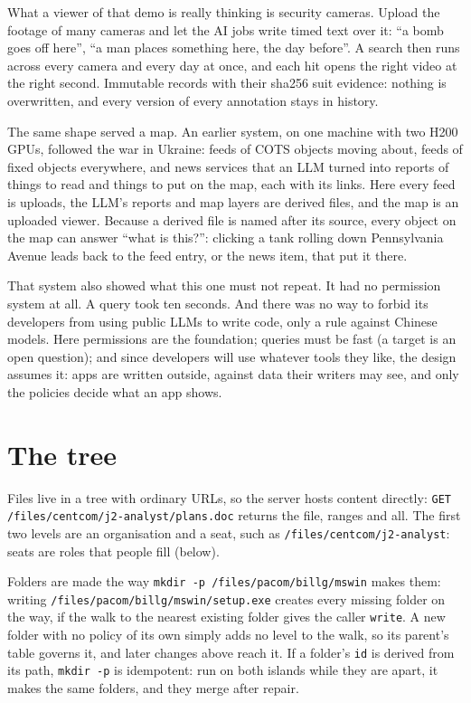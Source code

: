 \documentclass[11pt,oneside]{book}
\begin{document}
What a viewer of that demo is really thinking is security cameras. Upload the
footage of many cameras and let the AI jobs write timed text over it: ``a bomb
goes off here'', ``a man places something here, the day before''. A search then
runs across every camera and every day at once, and each hit opens the right
video at the right second. Immutable records with their sha256 suit evidence:
nothing is overwritten, and every version of every annotation stays in history.

The same shape served a map. An earlier system, on one machine with two
H200 GPUs, followed the war in Ukraine: feeds of COTS objects moving about, feeds
of fixed objects everywhere, and news services that an LLM turned into reports
of things to read and things to put on the map, each with its links. Here every
feed is uploads, the LLM's reports and map layers are derived files, and the map
is an uploaded viewer. Because a derived file is named after its source, every
object on the map can answer ``what is this?'': clicking a tank rolling down
Pennsylvania Avenue leads back to the feed entry, or the news item, that put it
there.

That system also showed what this one must not repeat. It had no permission
system at all. A query took ten seconds. And there was no way to forbid its
developers from using public LLMs to write code, only a rule against Chinese
models. Here permissions are the foundation; queries must be fast (a target is
an open question); and since developers will use whatever tools they like, the
design assumes it: apps are written outside, against data their writers may
see, and only the policies decide what an app shows.

\section{The tree}
Files live in a tree with ordinary URLs, so the server hosts content directly:
\texttt{GET /files/centcom/j2-analyst/plans.doc} returns the file, ranges and all.
The first two levels are an organisation and a seat, such as
\texttt{/files/centcom/j2-analyst}: seats are roles that people fill (below).

Folders are made the way \texttt{mkdir -p /files/pacom/billg/mswin} makes them:
writing \texttt{/files/pacom/billg/mswin/setup.exe} creates every missing folder on
the way, if the walk to the nearest existing folder gives the caller
\texttt{write}. A new folder with no policy of its own simply adds no level to
the walk, so its parent's table governs it, and later changes above reach it.
If a folder's \texttt{id} is derived from its path, \texttt{mkdir -p} is
idempotent: run on both islands while they are apart, it makes the same folders,
and they merge after repair.
\end{document}
